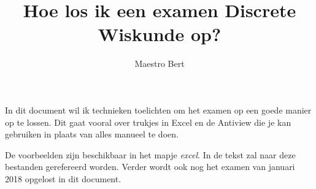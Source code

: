 \documentclass{article}
\begin{document}
\title{Hoe los ik een examen Discrete Wiskunde op?}
\date{}
\author{Maestro Bert}
\maketitle

\tableofcontents


In dit document wil ik technieken toelichten om het examen op een goede manier op te lossen. Dit gaat vooral over trukjes in Excel en de Antiview die je kan gebruiken in plaats van alles manueel te doen. 

De voorbeelden zijn beschikbaar in het mapje \textit{excel}. In de tekst zal naar deze bestanden gerefereerd worden. Verder wordt ook nog het examen van januari 2018 opgelost in dit document.
%  




\end{document}
